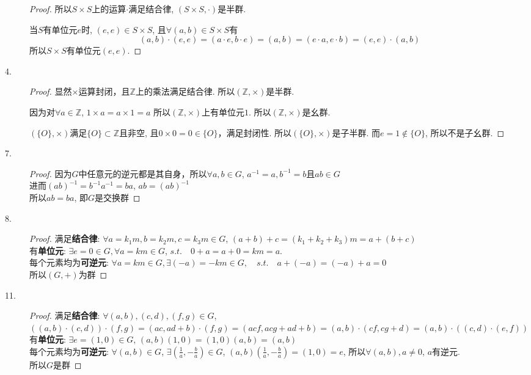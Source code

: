 \documentclass[UTF8, onecolumn, a4paper]{article}
\begin{document}
\begin{description}
\begin{proof}
	所以$S\times S$上的运算$\cdotp$满足结合律, $(S\times S, \cdotp)$是半群.
	
	当$S$有单位元$e$时, $(e, e)\in S\times S$, 且$\forall (a, b)\in S\times S$有
	$$(a,b)\cdot(e, e) = (a\cdot e, b\cdot e) = (a, b) = (e\cdot a, e\cdot b) = (e, e)\cdot(a, b)$$
	所以$S\times S$有单位元$(e, e)$.
\end{proof}	

\item[4.]
\begin{proof}
	显然$\times$运算封闭，且$\mathbb{Z}$上的乘法满足结合律. 所以$(\mathbb{Z},\times)$是半群.
	
	因为对$\forall a\in \mathbb{Z}$, $1\times a = a\times 1 = a$
	所以$(\mathbb{Z},\times)$上有单位元$1$. 所以$(\mathbb{Z},\times)$是幺群.
	
	$(\{O\}, \times)$满足$\{O\}\subset \mathbb{Z}$且非空, 且$0\times 0 = 0 \in \{O\}$，满足封闭性. 所以$(\{O\}, \times)$是子半群. 而$e = 1\notin \{O\}$, 所以不是子幺群.
\end{proof}

\item[7.]
\begin{proof}
因为$G$中任意元的逆元都是其自身，所以$\forall a, b\in G$, $a^{-1} = a, b^{-1} = b$且$ab\in G$\\
进而$(ab)^{-1} = b^{-1}a^{-1} = ba$, $ab = (ab)^{-1}$\\
所以$ab = ba$, 即$G$是交换群
\end{proof}


\item[8.]
\begin{proof}
满足\textbf{结合律}: $\forall a=k_1m, b=k_2m, c=k_3m\in G$, $(a + b) + c = (k_1 + k_2 + k_3)m = a + (b + c)$\\
有\textbf{单位元}: $\exists e = 0\in G, \forall a = km\in G$, $s.t.\quad 0 + a = a + 0 = km = a$.\\
每个元素均为\textbf{可逆元}: $\forall a = km\in G, \exists (-a) = -km\in G,\quad s.t.\quad a + (-a) = (-a) + a = 0$\\
所以$(G, +)$为群
\end{proof}

\item[11.]
\begin{proof}
满足\textbf{结合律}:  $\forall (a, b), (c, d), (f, g)\in G$, $((a,b)\cdot(c, d))\cdot(f, g) = (ac, ad + b)\cdot(f, g) = (acf, acg+ad+b) = (a, b)\cdot(cf, cg+d)= (a, b)\cdot((c,d)\cdot(e, f))$\\
有\textbf{单位元}: $\exists e = (1, 0)\in G$, $(a, b)(1, 0) = (1, 0)(a, b) = (a, b)$\\ 
每个元素均为\textbf{可逆元}: $\forall (a, b)\in G$, $\exists(\frac{1}{a}, -\frac{b}{a})\in G$, $(a, b)(\frac{1}{a}, -\frac{b}{a}) = (1, 0) = e$, 所以$\forall (a, b), a\neq 0$, $a$有逆元.\\
所以$G$是群
\end{proof}


\end{description}
\end{document}
